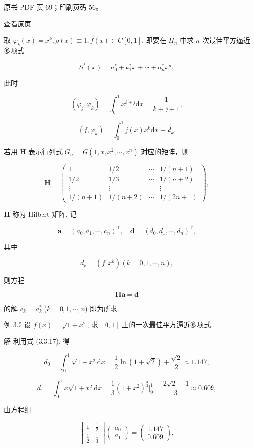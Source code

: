 \clearpage

原书 PDF 页 69；印刷页码 56。

\href{source-images/pdf-069.jpeg}{查看原页}

取 \(\varphi_k(x) = x^k, \rho(x) \equiv 1, f(x) \in C[0,1]\), 即要在 \(H_n\) 中求 \(n\) 次最佳平方逼近多项式

\[
S^*(x) = a_0^* + a_1^* x + \cdots + a_n^* x^n,
\]

此时

\[
(\varphi_j, \varphi_k) = \int_0^1 x^{k+j} \mathrm{d}x = \frac{1}{k+j+1},
\]

\[
(f, \varphi_k) = \int_0^1 f(x) x^k \mathrm{d}x \equiv d_k.
\]

若用 \(\boldsymbol{H}\) 表示行列式 \(G_n = G(1, x, x^2, \cdots, x^n)\) 对应的矩阵，则

\[\boldsymbol{H} = \begin{pmatrix}
1 & 1/2 & \cdots & 1/(n+1) \\
1/2 & 1/3 & \cdots & 1/(n+2) \\
\vdots & \vdots & & \vdots \\
1/(n+1) & 1/(n+2) & \cdots & 1/(2n+1)
\end{pmatrix}, \tag{3.3.16}
\]

\(\boldsymbol{H}\) 称为 Hilbert 矩阵. 记

\[
\boldsymbol{a} = (a_0, a_1, \cdots, a_n)^{\mathrm{T}}, \quad \boldsymbol{d} = (d_0, d_1, \cdots, d_n)^{\mathrm{T}},
\]

其中

\[
d_k = (f, x^k) (k=0, 1, \cdots, n), \tag{3.3.17}
\]

则方程

\[\boldsymbol{H}\boldsymbol{a}=\boldsymbol{d}
\]

的解 \(a_k = a_k^*\) (\(k=0, 1, \cdots, n\)) 即为所求.

例 3.2 设 \(f(x) = \sqrt{1+x^2}\), 求 \([0,1]\) 上的一次最佳平方逼近多项式.

解 利用式 (3.3.17), 得

\[
d_0 = \int_0^1 \sqrt{1+x^2} \mathrm{d}x = \frac{1}{2} \ln(1+\sqrt{2}) + \frac{\sqrt{2}}{2} \approx 1.147,
\]

\[
d_1 = \int_0^1 x \sqrt{1+x^2} \mathrm{d}x = \frac{1}{3} (1+x^2)^{\frac{3}{2}} \Bigg|_0^1 = \frac{2\sqrt{2}-1}{3} \approx 0.609,
\]

由方程组

\[
\begin{bmatrix}
1 & \frac{1}{2} \\
\frac{1}{2} & \frac{1}{3}
\end{bmatrix} \begin{pmatrix} a_0 \\ a_1 \end{pmatrix} = \begin{pmatrix} 1.147 \\ 0.609 \end{pmatrix},
\]

